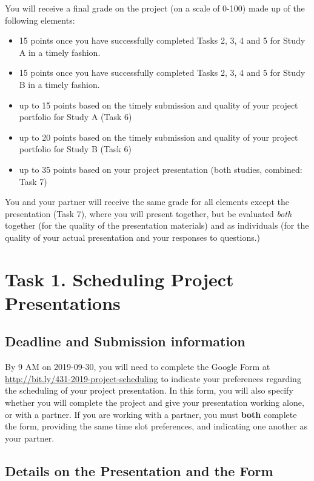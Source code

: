\documentclass[]{book}
\providecommand{\tightlist}{%
  \setlength{\itemsep}{0pt}\setlength{\parskip}{0pt}}
\begin{document}
You will receive a final grade on the project (on a scale of 0-100) made up of the following elements:

\begin{itemize}
\tightlist
\item
  15 points once you have successfully completed Tasks 2, 3, 4 and 5 for Study A in a timely fashion.
\item
  15 points once you have successfully completed Tasks 2, 3, 4 and 5 for Study B in a timely fashion.
\item
  up to 15 points based on the timely submission and quality of your project portfolio for Study A (Task 6)
\item
  up to 20 points based on the timely submission and quality of your project portfolio for Study B (Task 6)
\item
  up to 35 points based on your project presentation (both studies, combined: Task 7)
\end{itemize}

You and your partner will receive the same grade for all elements except the presentation (Task 7), where you will present together, but be evaluated \emph{both} together (for the quality of the presentation materials) and as individuals (for the quality of your actual presentation and your responses to questions.)

\hypertarget{task1}{%
\chapter{Task 1. Scheduling Project Presentations}\label{task1}}

\hypertarget{deadline-and-submission-information}{%
\section{Deadline and Submission information}\label{deadline-and-submission-information}}

By 9 AM on 2019-09-30, you will need to complete the Google Form at \url{http://bit.ly/431-2019-project-scheduling} to indicate your preferences regarding the scheduling of your project presentation. In this form, you will also specify whether you will complete the project and give your presentation working alone, or with a partner. If you are working with a partner, you must \textbf{both} complete the form, providing the same time slot preferences, and indicating one another as your partner.

\hypertarget{details-on-the-presentation-and-the-form}{%
\section{Details on the Presentation and the Form}\label{details-on-the-presentation-and-the-form}}
\end{document}
